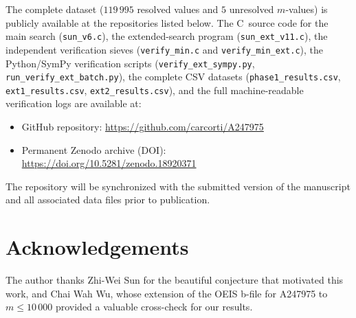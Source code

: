 \documentclass{amsart}
\theoremstyle{definition}
\theoremstyle{remark}
\numberwithin{equation}{section}
\begin{document}
The complete dataset ($119\,995$ resolved values and $5$ unresolved
$m$-values) is publicly available at the repositories listed below.
The C~source code for the main search (\texttt{sun\_v6.c}),
the extended-search program (\texttt{sun\_ext\_v11.c}),
the independent verification sieves
(\texttt{verify\_min.c} and \texttt{verify\_min\_ext.c}),
the Python/SymPy verification scripts
(\texttt{verify\_ext\_sympy.py}, \texttt{run\_verify\_ext\_batch.py}),
the complete CSV datasets
(\texttt{phase1\_results.csv}, \texttt{ext1\_results.csv},
\texttt{ext2\_results.csv}),
and the full machine-readable verification logs are available at:
\begin{itemize}
  \item GitHub repository:
        \url{https://github.com/carcorti/A247975}
  \item Permanent Zenodo archive (DOI):\\
        \url{https://doi.org/10.5281/zenodo.18920371}
\end{itemize}
The repository will be synchronized with the submitted version of the
manuscript and all associated data files prior to publication.

\section*{Acknowledgements}

The author thanks Zhi-Wei Sun for the beautiful conjecture that
motivated this work, and Chai Wah Wu, whose extension of the OEIS
b-file for A247975 to $m \leq 10\,000$ provided a valuable
cross-check for our results.
\end{document}
